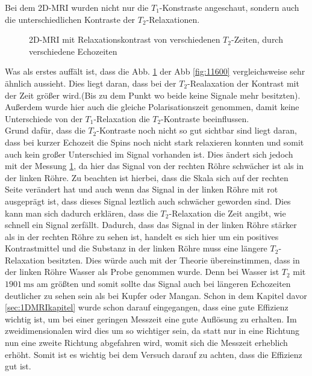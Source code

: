 Bei dem 2D-MRI wurden nicht nur die $T_1$-Konstraste angeschaut, sondern auch die unterschiedlichen Kontraste der $T_2$-Relaxationen. 

    \begin{figure}[H]
        \centering
        {}
        {}
        \caption{2D-MRI mit Relaxationskontrast von verschiedenen $T_2$-Zeiten, durch verschiedene Echozeiten}\label{fig:1250}
    \end{figure}
Was als erstes auffält ist, dass die Abb. \ref{fig:1250} der Abb \ref{fig:11600}  vergleichsweise sehr ähnlich aussieht. Dies liegt daran, dass bei der $T_2$-Realaxation der Kontrast mit der Zeit größer wird.(Bis zu dem Punkt wo beide keine Signale mehr besitzten). Außerdem wurde hier auch die gleiche Polarisationszeit genommen, damit keine Unterschiede von der $T_1$-Relaxation die $T_2$-Kontraste beeinflussen. \\
Grund dafür, dass die $T_2$-Kontraste noch nicht so gut sichtbar sind liegt daran, dass bei kurzer Echozeit die Spins noch nicht stark relaxieren konnten und somit auch kein großer Unterschied im Signal vorhanden ist. Dies ändert sich jedoch mit der Messung \ref{fig:1250}, da hier das Signal von der rechten Röhre schwächer ist als in der linken Röhre. Zu beachten ist hierbei, dass die Skala sich auf der rechten Seite verändert hat und auch wenn das Signal in der linken Röhre mit rot ausgeprägt ist, dass dieses Signal leztlich auch schwächer geworden sind. Dies kann man sich dadurch erklären, dass die $T_2$-Relaxation die Zeit angibt, wie schnell ein Signal zerfällt. Dadurch, dass das Signal in der linken Röhre stärker als in der rechten Röhre zu sehen ist, handelt es sich hier um ein positives Kontrastmittel und die Substanz in der linken Röhre muss eine längere $T_2$-Relaxation besitzten.  
Dies würde auch mit der Theorie übereinstimmen, dass in der linken Röhre Wasser als Probe genommen wurde. Denn bei Wasser ist $T_2$ mit  $\SI{1901}{\milli\second}$ am größten und somit sollte das Signal auch bei längeren Echozeiten deutlicher zu sehen sein als bei Kupfer oder Mangan.
Schon in dem Kapitel davor \ref{sec:1DMRIkapitel} wurde schon darauf eingegangen, dass eine gute Effizienz wichtig ist, um bei einer geringen Messzeit eine gute Auflösung zu erhalten. Im zweidimensionalen wird dies um so wichtiger sein, da statt nur in eine Richtung nun eine zweite Richtung abgefahren wird, womit sich die Messzeit erheblich erhöht. Somit ist es wichtig bei dem Versuch darauf zu achten, dass die Effizienz gut ist.